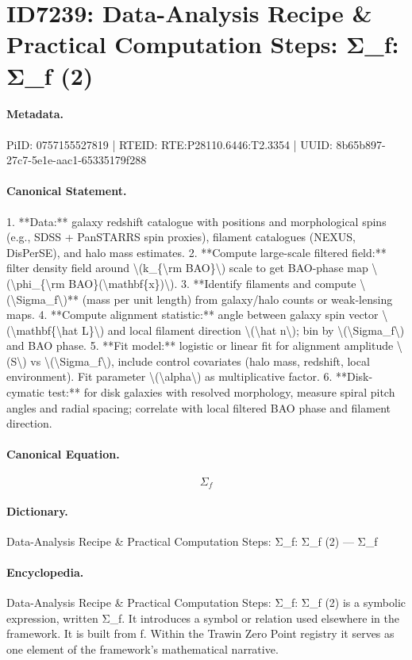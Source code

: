 \section*{ID7239: Data-Analysis Recipe \& Practical Computation Steps: Σ\_f: Σ\_f (2)}
\paragraph{Metadata.}
PiID: 0757155527819 | RTEID: RTE:P28110.6446:T2.3354 | UUID: 8b65b897-27c7-5e1e-aac1-65335179f288

\paragraph{Canonical Statement.}
1. **Data:** galaxy redshift catalogue with positions and morphological spins (e.g., SDSS + PanSTARRS spin proxies), filament catalogues (NEXUS, DisPerSE), and halo mass estimates. 2. **Compute large-scale filtered field:** filter density field around \textbackslash{}(k\_\{\textbackslash{}rm BAO\}\textbackslash{}) scale to get BAO-phase map \textbackslash{}(\textbackslash{}phi\_\{\textbackslash{}rm BAO\}(\textbackslash{}mathbf\{x\})\textbackslash{}). 3. **Identify filaments and compute \textbackslash{}(\textbackslash{}Sigma\_f\textbackslash{})** (mass per unit length) from galaxy/halo counts or weak-lensing maps. 4. **Compute alignment statistic:** angle between galaxy spin vector \textbackslash{}(\textbackslash{}mathbf\{\textbackslash{}hat L\}\textbackslash{}) and local filament direction \textbackslash{}(\textbackslash{}hat n\textbackslash{}); bin by \textbackslash{}(\textbackslash{}Sigma\_f\textbackslash{}) and BAO phase. 5. **Fit model:** logistic or linear fit for alignment amplitude \textbackslash{}(S\textbackslash{}) vs \textbackslash{}(\textbackslash{}Sigma\_f\textbackslash{}), include control covariates (halo mass, redshift, local environment). Fit parameter \textbackslash{}(\textbackslash{}alpha\textbackslash{}) as multiplicative factor. 6. **Disk-cymatic test:** for disk galaxies with resolved morphology, measure spiral pitch angles and radial spacing; correlate with local filtered BAO phase and filament direction.

\paragraph{Canonical Equation.}
\[
\Sigma_f
\]

\paragraph{Dictionary.}
Data-Analysis Recipe \& Practical Computation Steps: Σ\_f: Σ\_f (2) — Σ\_f

\paragraph{Encyclopedia.}
Data-Analysis Recipe \& Practical Computation Steps: Σ\_f: Σ\_f (2) is a symbolic expression, written Σ\_f. It introduces a symbol or relation used elsewhere in the framework. It is built from f. Within the Trawin Zero Point registry it serves as one element of the framework's mathematical narrative.
